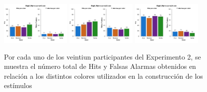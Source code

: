 \documentclass[a4paper ]{article}
\begin{document}
\begin{figure}[th]
\includegraphics[width=0.3\textwidth]{Figures/Color_Exp2_P19} \includegraphics[width=0.3\textwidth]{Figures/Color_Exp2_P20} \includegraphics[width=0.3\textwidth]{Figures/Color_Exp2_P21} 
\caption[Hits y Falsas Alarmas obtenidos por Color; Experimento 2]{Por cada uno de los veintiun participantes del Experimento 2, se muestra el número total de Hits y Falsas Alarmas obtenidos en relación a los distintos colores utilizados en la construcción de los estímulos}
\label{fig:Color_E2}
\end{figure}
\end{document}
